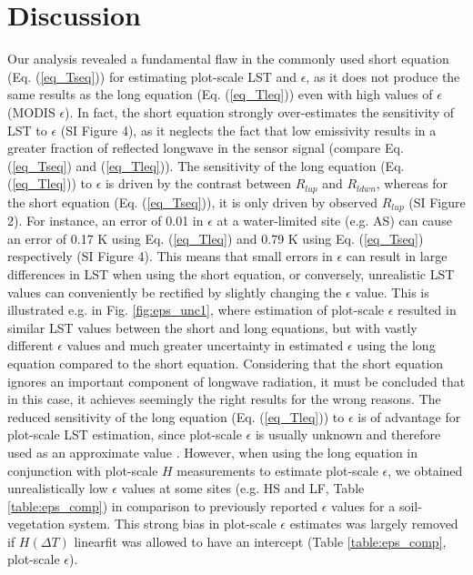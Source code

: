 \documentclass[fleqn,10pt]{wlscirep}
\begin{document}
\section{Discussion}
Our analysis revealed a fundamental flaw in the commonly used short equation (Eq. (\ref{eq_Tseq})) for estimating plot-scale LST and $\epsilon$, as it does not produce the same results as the long equation (Eq. (\ref{eq_Tleq})) even with high values of $\epsilon$ (MODIS $\epsilon$). In fact, the short equation strongly over-estimates the sensitivity of LST to $\epsilon$ (SI Figure 4), as it neglects the fact that low emissivity results in a greater fraction of reflected longwave in the sensor signal (compare Eq. (\ref{eq_Tseq}) and (\ref{eq_Tleq})). The sensitivity of the long equation (Eq. (\ref{eq_Tleq})) to $\epsilon$ is driven by the contrast between $R_{lup}$ and $R_{ldwn}$, whereas for the short equation (Eq. (\ref{eq_Tseq})), it is only driven by observed $R_{lup}$ (SI Figure 2). For instance, an error of 0.01 in $\epsilon$ at a water-limited site (e.g. AS) can cause an error of 0.17 K using Eq. (\ref{eq_Tleq}) and 0.79 K using Eq. (\ref{eq_Tseq}) respectively (SI Figure 4). This means that small errors in $\epsilon$ can result in large differences in LST when using the short equation, or conversely, unrealistic LST values can conveniently be rectified by slightly changing the $\epsilon$ value. This is illustrated e.g. in Fig. \ref{fig:eps_unc1}, where estimation of plot-scale $\epsilon$ resulted in similar LST values between the short and long equations, but with vastly different $\epsilon$ values and much greater uncertainty in estimated $\epsilon$ using the long equation compared to the short equation. Considering that the short equation ignores an important component of longwave radiation, it must be concluded that in this case, it achieves seemingly the right results for the wrong reasons. The reduced sensitivity of the long equation (Eq. (\ref{eq_Tleq})) to $\epsilon$ is of advantage for plot-scale LST estimation, since plot-scale $\epsilon$ is usually unknown and therefore used as an approximate value \cite{mallick2018bridging}. However, when using the long equation in conjunction with plot-scale $H$ measurements to estimate plot-scale $\epsilon$, we obtained unrealistically low $\epsilon$ values at some sites (e.g. HS and LF, Table \ref{table:eps_comp}) in comparison to previously reported  $\epsilon$ values for a soil-vegetation system\cite{sugita1996optimal,snyder1998classification}. This strong bias in plot-scale $\epsilon$ estimates was largely removed if  $H(\Delta T)$ linearfit was allowed to have an intercept (Table \ref{table:eps_comp}, plot-scale $\epsilon$). 
\end{document}
